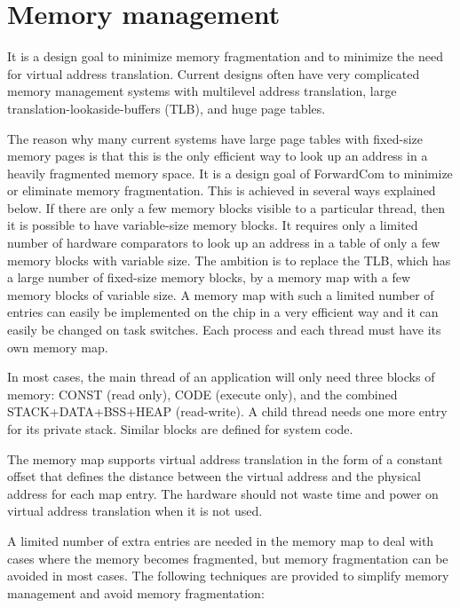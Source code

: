 \documentclass[forwardcom.tex]{subfiles}
\begin{document}
\section{Memory management} \label{memoryManagement}
It is a design goal to minimize memory fragmentation and to minimize the need for virtual address translation. Current designs often have very complicated memory management systems with multilevel address translation, large translation-lookaside-buffers (TLB), and huge page tables. 
\vspace{2mm}

The reason why many current systems have large page tables with fixed-size memory pages is that this is the only efficient way to look up an address in a heavily fragmented memory space. It is a design goal of ForwardCom to minimize or eliminate memory fragmentation. This is achieved in several ways explained below. If there are only a few memory blocks visible to a particular thread, then it is possible to have variable-size memory blocks. It requires only a limited number of hardware comparators to look up an address in a table of only a few memory blocks with variable size. The ambition is to replace the TLB, which has a large number of fixed-size memory blocks, by a memory map with a few memory blocks of variable size. 
A memory map with such a limited number of entries can easily be implemented on the chip in a very efficient way and it can easily be changed on task switches. Each process and each thread must have its own memory map.
\vspace{2mm}

In most cases, the main thread of an application will only need three blocks of memory: CONST (read only), CODE (execute only), and the combined STACK+DATA+BSS+HEAP (read-write). A child thread needs one more entry for its private stack. Similar blocks are defined for system code. 
\vspace{2mm}

The memory map supports virtual address translation in the form of a constant offset that defines the distance between the virtual address and the physical address for each map entry. The hardware should not waste time and power on virtual address translation when it is not used.
\vspace{2mm}

A limited number of extra entries are needed in the memory map to deal with cases where the memory becomes fragmented, but memory fragmentation can be avoided in most cases. The following techniques are provided to simplify memory management and avoid memory fragmentation:
\end{document}
